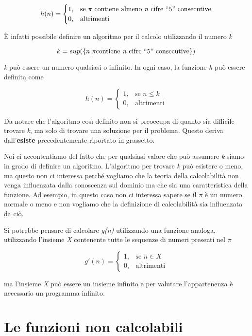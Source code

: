 $$
h(n) = \begin{cases}
1, &\text{se $\pi$ contiene almeno \textit{n} cifre ``5'' consecutive} \\
0, &\text{altrimenti}
\end{cases}
$$

\`{E} infatti possibile definire un algoritmo per il calcolo utilizzando il numero \textit{k}

$$
k = sup( \{n | \pi \text{contiene \textit{n} cifre ``5'' consecutive}\} )
$$

\emph{k} può essere un numero qualsiasi o infinito. In ogni caso, la
funzione \emph{h} può essere definita come


$$
h(n) = \begin{cases}
1, &\text{se }  n \leq k\\
0, &\text{altrimenti}
\end{cases}
$$

Da notare che l'algoritmo così definito non si preoccupa di quanto sia
difficile trovare \emph{k}, ma solo di trovare una soluzione per il
problema.
Questo deriva dall'\textbf{esiste} precedentemente riportato in
grassetto.

Noi ci accontentiamo del fatto che per qualsiasi valore che può
assumere \emph{k} siamo in grado di definire un algoritmo. L'algoritmo per trovare
\emph{k} può esistere o meno, ma questo non ci interessa perché vogliamo
che la teoria della calcolabilità non venga influenzata dalla conoscenza
sul dominio ma che sia una caratteristica della funzione. 
Ad esempio, in questo caso non ci interessa sapere se il $\pi$ è un numero normale o
meno e non vogliamo che la definizione di calcolabilità sia influenzata
da ciò.

Si potrebbe pensare di calcolare \emph{g(n)} utilizzando una funzione analoga, utilizzando l'insieme \textit{X} contenente tutte le sequenze di numeri presenti nel $ \pi $


$$
g'(n) = \begin{cases}
1, &\text{se } n \in X \\
0, &\text{altrimenti}
\end{cases}
$$

ma l'insieme \emph{X} può essere un insieme infinito e per valutare
l'appartenenza è necessario un programma infinito.

\section{Le funzioni non calcolabili}\label{le-funzioni-non-calcolabili}

